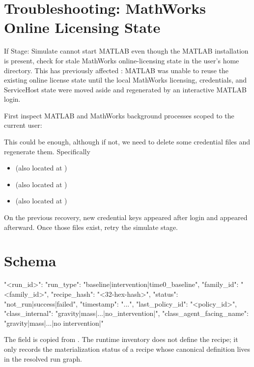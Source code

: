 \documentclass[11pt]{article}
\begin{document}
\section*{Troubleshooting: MathWorks Online Licensing State}

If Stage: Simulate cannot start MATLAB even though the MATLAB installation is present, check for stale MathWorks online-licensing state in the user's home directory.
This has previously affected : MATLAB was unable to reuse the existing online license state until the local MathWorks licensing, credentials, and ServiceHost state were moved aside and regenerated by an interactive MATLAB login.

First inspect MATLAB and MathWorks background processes scoped to the current user:


This could be enough, although if not, we need to delete some credential files and regenerate them. 
Specifically


\begin{itemize}
\item {} (also located at )
\item {} (also located at )
\item {} (also located at )
\end{itemize}

On the previous recovery, new credential keys appeared after login and  appeared afterward.
Once those files exist, retry the simulate stage.

\label{sec:simulation-model-record-schema}
\section*{ Schema}

\begin{DocCode}
{
  "<run_id>": {
    "run_type": "baseline|intervention|time0_baseline",
    "family_id": "<family_id>",
    "recipe_hash": "<32-hex-hash>",
    "status": "not_run|success|failed",
    "timestamp": "...",
    "last_policy_id": "<policy_id>",
    "class_internal": "gravity|mass|...|no_intervention|",
    "class_agent_facing_name": "gravity|mass|...|no intervention|"
  }
}
\end{DocCode}

The  field is copied from .
The runtime inventory does not define the recipe; it only records the materialization status of a recipe whose canonical definition lives in the resolved run graph.
\end{document}
